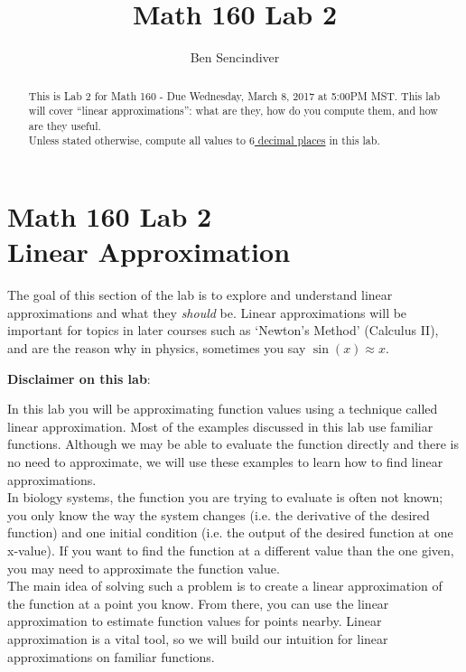 \documentclass[handout,nooutcomes]{ximera}
\title{Math 160 Lab 2}
\author{Ben Sencindiver} %
\begin{document}
\section{Math 160 Lab 2 \\ Linear Approximation}

\begin{abstract}
This is Lab 2 for Math 160 - Due Wednesday, March 8, 2017 at 5:00PM MST.
This lab will cover ``linear approximations'': what are they,
how do you compute them, and how are they useful. \\

Unless stated otherwise, compute all values to \underline{$6$ decimal places} in this lab.
\end{abstract}



\maketitle



The goal of this section of the lab is to explore and understand linear
approximations and what they {\it should} be. Linear approximations will
be important for topics in later courses such as `Newton's Method' (Calculus II),
and are the reason why in physics, sometimes you say $\sin(x)\approx x$.

\textbf{Disclaimer on this lab}:

In this lab you will be approximating function values using a technique
called linear approximation.  Most of the examples discussed in this
lab use familiar functions.  Although we may be able to evaluate the function
directly and there is no need to approximate, we will use these examples
to learn how to find linear approximations.\\


In biology systems, the function you are trying to evaluate is often
not known; you only know the way the system changes (i.e. the derivative
of the desired function) and one initial condition (i.e. the output of the
desired function at one x-value). If you want to find the function at a different
value than the one given, you may need to approximate the function value.\\

The main idea of solving such a problem is to create a linear approximation
of the function at a point you know.  From there, you can use the linear
approximation to estimate function values for points nearby. Linear
approximation is a vital tool, so we will build our intuition for
linear approximations on familiar functions. \\
\end{document}
